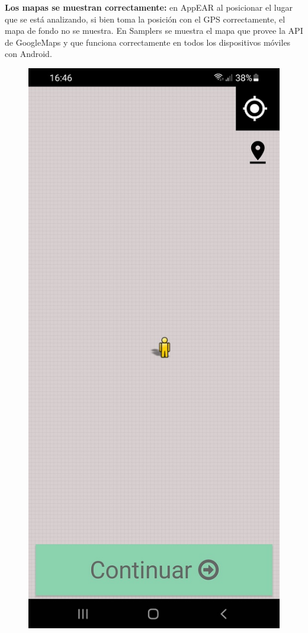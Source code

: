 \newpage

\textbf{Los mapas se muestran correctamente:} en AppEAR al posicionar el lugar que se está analizando, si bien toma la posición con el GPS correctamente, el mapa de fondo no se muestra. En Samplers se muestra el mapa que provee la API de GoogleMaps y que funciona correctamente en todos los dispositivos móviles con Android.

\begin{figure}[H]
  \centering
   \includegraphics[scale=0.3]{06-caso_de_uso/appear_mapa.jpg} 

\end{figure}
